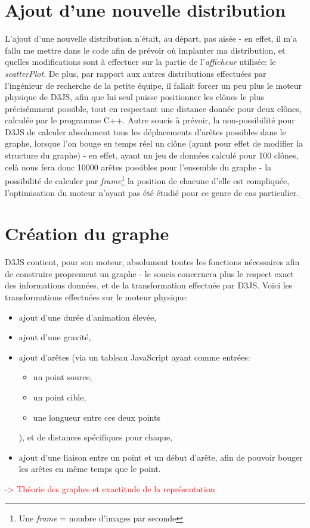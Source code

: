 \documentclass[12pt]{report}
\begin{document}
\begin{spacing}{1.2}
\section{Ajout d'une nouvelle distribution}
L'ajout d'une nouvelle distribution n'était, au départ, pas aisée - en effet, il m'a fallu me mettre dans le code afin de prévoir où implanter ma distribution, et quelles modifications sont à effectuer sur la partie de l'\textit{afficheur} utilisée: le \textit{scatterPlot}.
\newline
De plus, par rapport aux autres distributions effectuées par l'ingénieur de recherche de la petite équipe, il fallait forcer un peu plus le moteur physique de D3JS, afin que lui seul puisse positionner les clônes le plus précisémment possible, tout en respectant une distance donnée pour deux clônes, calculée par le programme C++.
\newline
Autre soucis à prévoir, la non-possibilité pour D3JS de calculer absolument tous les déplacements d'arêtes possibles dans le graphe, lorsque l'on bouge en temps réel un clône (ayant pour effet de modifier la structure du graphe) - en effet, ayant un jeu de données calculé pour 100 clônes, celà nous fera donc 10000 arêtes possibles pour l'ensemble du graphe - la possibilité de calculer par \textit{frame}\footnote{Une \textit{frame} = nombre d'images par seconde} la position de chacune d'elle est compliquée, l'optimisation du moteur n'ayant pas été étudié pour ce genre de cas particulier.

\section{Création du graphe}
D3JS contient, pour son moteur, absolument toutes les fonctions nécessaires afin de construire proprement un graphe - le soucis concernera plus le respect exact des informations données, et de la transformation effectuée par D3JS.
\newline
Voici les transformations effectuées sur le moteur physique:
\begin{itemize}
\item{ajout d'une durée d'animation élevée,}
\item{ajout d'une gravité,}
\item{ajout d'arêtes (via un tableau JavaScript ayant comme entrées:	
\begin{itemize}
\item{un point source,}
\item{un point cible,}
\item{une longueur entre ces deux points}
\end{itemize}
), et de distances spécifiques pour chaque,}
\item{ajout d'une liaison entre un point et un début d'arête, afin de pouvoir bouger les arêtes en même temps que le point.}
\end{itemize}
\textcolor{red}{-> Théorie des graphes et exactitude de la représentation}


\end{spacing}
\end{document}

